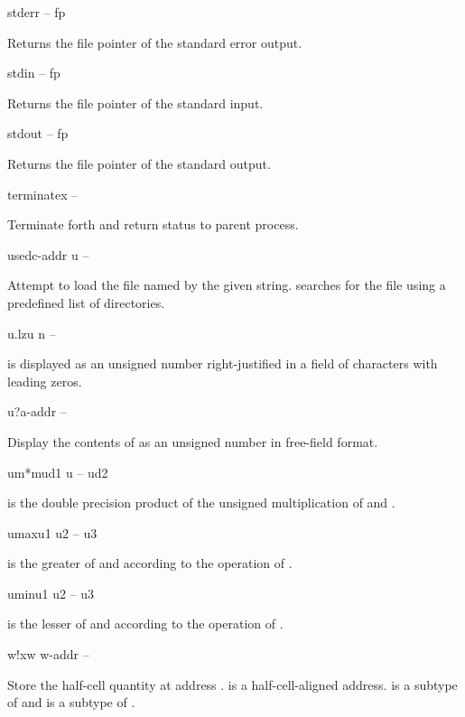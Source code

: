 \begin{gloss}{stderr}{ -- fp}

Returns the file pointer of the standard error output.
\end{gloss}
\begin{gloss}{stdin}{ -- fp}

Returns the file pointer of the standard input.
\end{gloss}
\begin{gloss}{stdout}{ -- fp}

Returns the file pointer of the standard output.
\end{gloss}
\begin{gloss}{terminate}{x -- }

Terminate forth and return status  to parent process.
\end{gloss}
\begin{gloss}{used}{c-addr u -- }

Attempt to load the file named by the given string.   searches
for the file using a predefined list of directories.
\end{gloss}
\begin{gloss}{u.lz}{u n -- }

 is displayed as an unsigned number right-justified in a field
of  characters with leading zeros.
\end{gloss}
\begin{gloss}{u?}{a-addr -- }

Display the contents of  as an unsigned number
in free-field format.
\end{gloss}
\begin{gloss}{um*m}{ud1 u -- ud2}

 is the double precision product of the unsigned multiplication
of  and .
\end{gloss}
\begin{gloss}{umax}{u1 u2 -- u3}

 is the greater of  and 
according to the operation of .
\end{gloss}
\begin{gloss}{umin}{u1 u2 -- u3}

 is the lesser of  and 
according to the operation of .
\end{gloss}
\begin{gloss}{w!}{xw w-addr -- }

Store the half-cell quantity  at address .
 is a half-cell-aligned address.
 is a subtype of
 and  is a subtype of .
\end{gloss}
